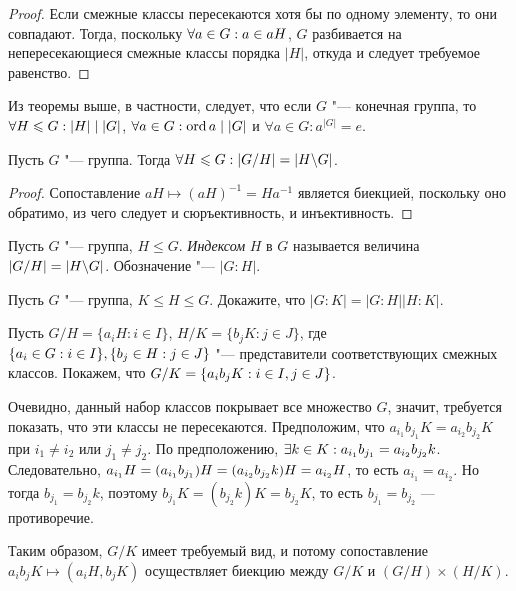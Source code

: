 \begin{proof}
	Если смежные классы пересекаются хотя бы по одному элементу, то они совпадают. Тогда, поскольку $\forall a \in G: a \hm\in aH$, $G$ разбивается на непересекающиеся смежные классы порядка $|H|$, откуда и следует требуемое равенство.
\end{proof}

\begin{reminder}
	Из теоремы выше, в частности, следует, что если $G$ "--- конечная группа, то $\forall H \hm\le G: |H| \mid |G|$, $\forall a \in G: \operatorname{ord}{a} \mid |G|$ и $\forall a \in G: a^{|G|} = e$.
\end{reminder}

\begin{proposition}
	Пусть $G$ "--- группа. Тогда $\forall H \le G: |G / H| \hm= |H \bs G|$.
\end{proposition}

\begin{proof}
	Сопоставление $aH \mapsto (aH)^{-1} = Ha^{-1}$ является биекцией, поскольку оно обратимо, из чего следует и сюръективность, и инъективность.
\end{proof}

\begin{definition}
	Пусть $G$ "--- группа, $H \le G$. \textit{Индексом} $H$ в $G$ называется величина $|G / H| = |H \backslash G|$. Обозначение "--- $|G : H|$.
\end{definition}

\begin{exercise}
	Пусть $G$ "--- группа, $K \le H \le G$. Докажите, что $|G : K| = |G : H||H : K|$.
\end{exercise}

\begin{solution}
	Пусть $G / H = \{a_iH: i \in I\}$, $H / K = \{b_jK: j \in J\}$, где $\{a_i \in G: i \in I\}, \{b_j \hm\in H: j \in J\}$ "--- представители соответствующих смежных классов. Покажем, что $G / K \hm= \{a_ib_jK : i \in I, j \in J\}$.
	
	Очевидно, данный набор классов покрывает все множество $G$, значит, требуется показать, что эти классы не пересекаются. Предположим, что $a_{i_1}b_{j_1}K = a_{i_2}b_{j_2}K$ при $i_1 \ne i_2$ или $j_1 \ne j_2$. По предположению, $\exists k \in K: a_{i_1}b_{j_1} \hm= a_{i_2}b_{j_2}k$. Следовательно, $a_{i_1}H = (a_{i_1}b_{j_1})H \hm= (a_{i_2}b_{j_2}k)H = a_{i_2}H$, то есть $a_{i_1} = a_{i_2}$. Но тогда $b_{j_1} = b_{j_2}k$, поэтому $b_{j_1}K = (b_{j_2}k)K = b_{j_2}K$, то есть $b_{j_1} = b_{j_2}$ --- противоречие.
	
	Таким образом, $G / K$ имеет требуемый вид, и потому сопоставление $a_ib_jK \mapsto (a_iH, b_jK)$ осуществляет биекцию между $G / K$ и $(G / H) \times (H / K)$.
\end{solution}